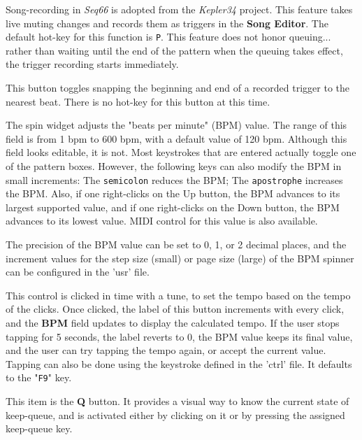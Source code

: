    Song-recording in \textsl{Seq66} is adopted from the
   \textsl{Kepler34} project.
   This feature takes live muting changes and records them as
   triggers in the \textbf{Song Editor}.
   The default hot-key for this function is \texttt{P}.
   This feature does not honor queuing...
   rather than waiting until the end of the pattern when the queuing takes
   effect, the trigger recording starts immediately.

   This button toggles snapping the beginning and end of a recorded trigger to
   the nearest beat.  There is no hot-key for this button at this time.

   The spin widget adjusts the "beats per minute" (BPM) value.  The
   range of this field is from 1 bpm to 600 bpm, with a default value of
   120 bpm.
   Although this field looks editable, it is not.  Most keystrokes
   that are entered actually toggle one of the pattern boxes.
   However, the following keys can also modify the BPM in small increments:
   The \texttt{semicolon} reduces the BPM;
   The \texttt{apostrophe} increases the BPM.
   Also, if one right-clicks on the Up button, the BPM advances to its largest
   supported value, and if one right-clicks on the Down button, the BPM
   advances to its lowest value.
   MIDI control for this value is also available.

   The precision of the BPM value can be set to 0, 1, or 2
   decimal places, and the increment values for the step size (small)
   or page size (large) of the BPM spinner can be configured in the 'usr' file.

   This control is clicked in time with a tune, to set the
   tempo based on the tempo of the clicks.  Once clicked, the label of this
   button increments with every click, and the \textbf{BPM} field updates to
   display the calculated tempo.  If the user stops tapping for 5 seconds, the
   label reverts to 0, the BPM value keeps its final value, and the user can
   try tapping the tempo again, or accept the current value.
   Tapping can also be done using the keystroke defined
   in the 'ctrl' file.
   It defaults to the "\texttt{F9}" key.

   This item is the \textbf{Q} button.
   It provides a visual way to know the current state of keep-queue, and is
   activated either by clicking on it or by pressing the assigned keep-queue
   key.

